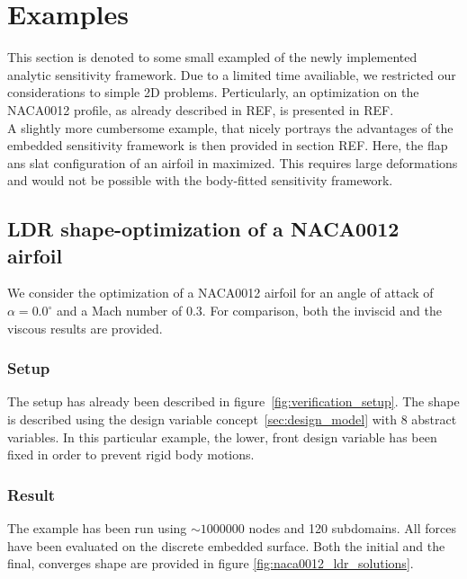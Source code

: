 \documentclass[../main.tex]{subfiles}
\begin{document}
\setlength{\delimitershortfall}{0pt}

\FloatBarrier 
\chapter{Examples}\label{sec:examples}
\minitoc


This section is denoted to some small exampled of the newly implemented analytic sensitivity framework. Due to a limited time availiable, we restricted our considerations to simple 2D problems. Perticularly, an optimization on the NACA0012 profile, as already described in REF, is presented in REF.\\
A slightly more cumbersome example, that nicely portrays the advantages of the embedded sensitivity framework is then provided in section REF. Here, the flap ans slat configuration of an airfoil in maximized. This requires large deformations and would not be possible with the body-fitted sensitivity framework.

\section{\ac{LDR} shape-optimization of a NACA0012 airfoil}\label{sec:example_naca}
We consider the optimization of a NACA0012 airfoil for an angle of attack of $\alpha=0.0^{\circ}$ and a Mach number of 0.3. For comparison, both the inviscid and the viscous results are provided.


\subsection{Setup}
The setup has already been described in figure~\ref{fig:verification_setup}. The shape is described using the design variable concept~\ref{sec:design_model} with $8$ abstract variables.
In this particular example, the lower, front design variable has been fixed in order to prevent rigid body motions.
\subsection{Result}

The example has been run using $\sim1000000$ nodes and 120 subdomains. All forces have been evaluated on the discrete embedded surface. Both the initial and the final, converges shape are provided in figure \ref{fig:naca0012_ldr_solutions}.
\end{document}
